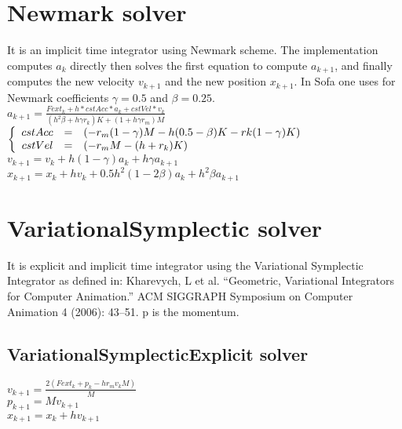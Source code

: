 \documentclass[12pt]{article}
\begin{document}
\begin{doublespace}
\section{Newmark solver}
It is an implicit time integrator using Newmark scheme.
The implementation computes $a_{k}$ directly then solves the first equation to compute $a_{k+1}$, and finally computes the new velocity $v_{k+1}$ and the new position $x_{k+1}$. In Sofa one uses for Newmark coefficients $\gamma=0.5$ and $\beta=0.25$.
\\$ a_{k+1} = \frac{Fext_{k} + h*cstAcc*a_{k}+cstVel*v_{k}}{(h^2\beta + h\gamma r_{k})K+(1+h\gamma r_{m})M} $
$\left\{
\begin{array}{r c l}
cstAcc &=& (-r_{m}(1-\gamma)M-h(0.5-\beta)K-rk(1-\gamma)K)\\
cstVel &=& (-r_{m}M-(h+r_{k})K)
\end{array}
\right.$
\\$ v_{k+1} = v_{k}+h(1-\gamma)a_{k}+h\gamma a_{k+1} $
\\$ x_{k+1} = x_{k}+hv_{k}+0.5h^2(1-2\beta)a_{k}+h^2\beta a_{k+1} $

\section{VariationalSymplectic solver}
It is explicit and implicit time integrator using the Variational Symplectic Integrator as defined in: Kharevych, L et al. “Geometric, Variational Integrators for Computer Animation.” ACM SIGGRAPH Symposium on Computer Animation 4 (2006): 43–51. p is the momentum.

\subsection{VariationalSymplecticExplicit solver}

$ v_{k+1} = \frac{2(Fext_{k}+p_{k}-hr_{m}v_{k}M)}{M} $
\\$ p_{k+1} = Mv_{k+1} $
\\$ x_{k+1} = x_{k}+hv_{k+1} $


\end{doublespace}
\end{document}
